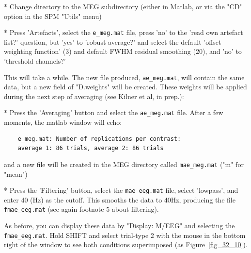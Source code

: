 * Change directory to the MEG subdirectory (either in Matlab, or via the "CD" option in the SPM "Utils" menu)

* Press 'Artefacts', select the \verb!e_meg.mat! file, press 'no' to the 'read own artefact list?' question, but 'yes' to 'robust average?' and select the default 'offset weighting function' (3) and default FWHM residual smoothing (20), and 'no' to 'threshold channels?'

This will take a while. The new file produced, \verb!ae_meg.mat!, will contain the same data, but a new field of "D.weights" will be created. These weights will be applied during the next step of averaging (see Kilner et al, in prep.):

* Press the 'Averaging' button and select the \verb!ae_meg.mat! file. After a few moments, the matlab window will echo:
\begin{verbatim}
	e_meg.mat: Number of replications per contrast:
	average 1: 86 trials, average 2: 86 trials
\end{verbatim}
	and a new file will be created in the MEG directory called \verb!mae_meg.mat! 	 ("m" for "mean")

* Press the 'Filtering' button, select the \verb!mae_eeg.mat! file, select 'lowpass', and enter 40 (Hz) as the cutoff. This smooths the data to 40Hz, producing the file \verb!fmae_eeg.mat! (see again footnote 5 about filtering).

As before, you can display these data by "Display: M/EEG" and selecting the \verb!fmae_eeg.mat!. Hold SHIFT and select trial-type 2 with the mouse in the bottom right of the window to see both conditions superimposed (as Figure~\ref{fig_32_10}).

